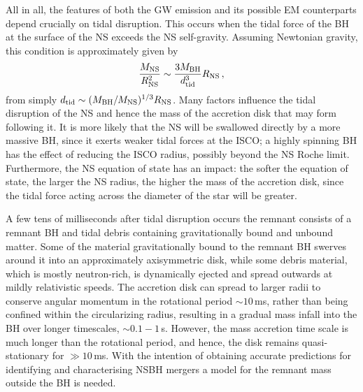\documentclass[binding=0.6cm, LaM]{sapthesis}
\begin{document}
        All in all, the features of both the GW emission and its possible EM counterparts depend crucially on tidal disruption.
        This occurs when the tidal force of the BH at the surface of the NS exceeds 
        the NS self-gravity. Assuming Newtonian gravity, this condition is approximately given by
        \begin{equation}
          {{M_{\rm NS}} \over {R_{\rm NS}^2}} \sim {{3M_{\rm BH}} \over {d_{\rm tid}^3}}R_{\rm NS}\,,
        \end{equation}
        from simply $d_{\rm tid} \sim (M_{\rm BH}/M_{\rm NS})^{1/3}R_{\rm NS}$.
	Many factors influence the tidal disruption of the NS and hence the mass of the accretion disk that may form following it. 
	It is more likely that the NS will be swallowed directly by a more massive BH, 
	since it exerts weaker tidal forces at the ISCO;
	a highly spinning BH has the effect of reducing the ISCO radius,
	possibly beyond the NS Roche limit.
	Furthermore, the NS equation of state has an impact:
	the softer the equation of state, the larger the NS radius, the higher the mass of the accretion disk,
	since the tidal force acting across the diameter of the star will be greater.

        A few tens of milliseconds after tidal disruption occurs the remnant consists of
        a remnant BH and tidal debris containing gravitationally bound and unbound matter.
        Some of the material gravitationally bound to the remnant BH swerves
        around it into an approximately axisymmetric disk, while some debris material,
        which is mostly neutron-rich, is dynamically ejected and spread outwards at mildly relativistic speeds.
	The accretion disk can spread to larger radii to conserve angular momentum in the rotational period $\sim 10\,$ms,
        rather than being confined within the circularizing radius, resulting in a gradual mass infall into the BH over longer timescales, $\sim 0.1-1\,$s.
        However, the mass accretion time scale is much longer than the rotational period, and hence, the disk remains quasi-stationary for $\gg 10\,$ms.
        With the intention of obtaining accurate predictions for identifying and characterising NSBH mergers
        a model for the remnant mass outside the BH is needed.
\end{document}
